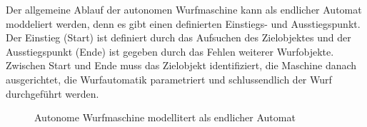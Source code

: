 Der allgemeine Ablauf der autonomen Wurfmaschine kann als endlicher Automat
moddeliert werden, denn es gibt einen definierten Einstiegs- und 
Ausstiegspunkt. Der Einstieg (Start) ist definiert durch das Aufsuchen des
Zielobjektes und der Ausstiegspunkt (Ende) ist gegeben durch das Fehlen
weiterer Wurfobjekte. Zwischen Start und Ende muss das Zielobjekt
identifiziert, die Maschine danach ausgerichtet, die Wurfautomatik
parametriert und schlussendlich der Wurf durchgeführt werden.

\begin{figure}[h!]
	\centering
{}
	\caption{Autonome Wurfmaschine modellitert als endlicher Automat}
\end{figure}
